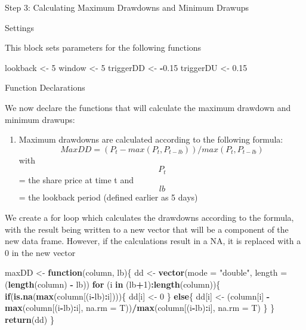 \documentclass[]{article}
\newenvironment{Shaded}{\begin{snugshade}}{\end{snugshade}}
\newcommand{\KeywordTok}[1]{\textcolor[rgb]{0.13,0.29,0.53}{\textbf{#1}}}
\newcommand{\DataTypeTok}[1]{\textcolor[rgb]{0.13,0.29,0.53}{#1}}
\newcommand{\DecValTok}[1]{\textcolor[rgb]{0.00,0.00,0.81}{#1}}
\newcommand{\FloatTok}[1]{\textcolor[rgb]{0.00,0.00,0.81}{#1}}
\newcommand{\StringTok}[1]{\textcolor[rgb]{0.31,0.60,0.02}{#1}}
\newcommand{\ControlFlowTok}[1]{\textcolor[rgb]{0.13,0.29,0.53}{\textbf{#1}}}
\newcommand{\OperatorTok}[1]{\textcolor[rgb]{0.81,0.36,0.00}{\textbf{#1}}}
\newcommand{\NormalTok}[1]{#1}
\providecommand{\tightlist}{%
  \setlength{\itemsep}{0pt}\setlength{\parskip}{0pt}}
\begin{document}
Step 3: Calculating Maximum Drawdowns and Minimum Drawups

Settings

This block sets parameters for the following functions

\begin{Shaded}
\begin{Highlighting}[]
\NormalTok{lookback <-}\StringTok{ }\DecValTok{5} 
\NormalTok{window <-}\StringTok{ }\DecValTok{5}
\NormalTok{triggerDD <-}\StringTok{ }\OperatorTok{-}\FloatTok{0.15}
\NormalTok{triggerDU <-}\StringTok{ }\FloatTok{0.15}
\end{Highlighting}
\end{Shaded}

Function Declarations

We now declare the functions that will calculate the maximum drawdown
and minimum drawups:

\begin{enumerate}
\def\labelenumi{\arabic{enumi})}
\tightlist
\item
  Maximum drawdowns are calculated according to the following formula:
  \[ MaxDD = (P_{t} -  max(P_{t}, P_{t-lb} ))/ max(P_{t}, P_{t-lb}) \]
  with \[ P_{t} \] = the share price at time t and \[lb\] = the lookback
  period (defined earlier as 5 days)
\end{enumerate}

We create a for loop which calculates the drawdowns according to the
formula, with the result being written to a new vector that will be a
component of the new data frame. However, if the calculations result in
a NA, it is replaced with a 0 in the new vector

\begin{Shaded}
\begin{Highlighting}[]
\NormalTok{maxDD <-}\StringTok{  }\ControlFlowTok{function}\NormalTok{(column, lb)\{}
\NormalTok{  dd <-}\StringTok{ }\KeywordTok{vector}\NormalTok{(}\DataTypeTok{mode =} \StringTok{"double"}\NormalTok{, }\DataTypeTok{length =}\NormalTok{ (}\KeywordTok{length}\NormalTok{(column) }\OperatorTok{-}\StringTok{ }\NormalTok{lb))}
  \ControlFlowTok{for}\NormalTok{ (i }\ControlFlowTok{in}\NormalTok{ (lb}\OperatorTok{+}\DecValTok{1}\NormalTok{)}\OperatorTok{:}\KeywordTok{length}\NormalTok{(column))\{}
    \ControlFlowTok{if}\NormalTok{(}\KeywordTok{is.na}\NormalTok{(}\KeywordTok{max}\NormalTok{(column[(i}\OperatorTok{-}\NormalTok{lb)}\OperatorTok{:}\NormalTok{i])))\{}
\NormalTok{      dd[i] <-}\StringTok{ }\DecValTok{0}
\NormalTok{    \} }\ControlFlowTok{else}\NormalTok{\{}
\NormalTok{      dd[i] <-}\StringTok{ }\NormalTok{(column[i] }\OperatorTok{-}\StringTok{ }\KeywordTok{max}\NormalTok{(column[(i}\OperatorTok{-}\NormalTok{lb)}\OperatorTok{:}\NormalTok{i], }\DataTypeTok{na.rm =}\NormalTok{ T))}\OperatorTok{/}\KeywordTok{max}\NormalTok{(column[(i}\OperatorTok{-}\NormalTok{lb)}\OperatorTok{:}\NormalTok{i], }\DataTypeTok{na.rm =}\NormalTok{ T)}
\NormalTok{    \}}
\NormalTok{  \}}
  \KeywordTok{return}\NormalTok{(dd)}
\NormalTok{\}}
\end{Highlighting}
\end{Shaded}
\end{document}
